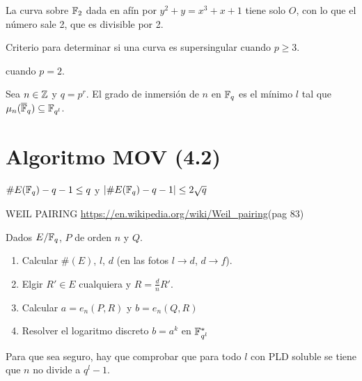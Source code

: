 \documentclass[CR.tex]{subfiles}
\begin{document}
\begin{ej}
La curva sobre $\mathbb{F}_2$ dada en afín por $y^2+y=x^3+x+1$ tiene solo $O$, con lo que el número sale 2, que es divisible por 2. 
\end{ej}

\begin{prop}[3.4.3]
Criterio para determinar si una curva es supersingular cuando $p\geq 3$. 
\end{prop}
\begin{prop}[3.4.4]
 cuando $p=2$. 
\end{prop}

\begin{defi}
Sea $n\in\mathbb{Z}$ y $q=p^r$. El grado de inmersión de $n$ en $\mathbb{F}_q$ es el mínimo $l$ tal que $\mu_n(\overline{\mathbb{F}}_q)\subseteq \mathbb{F}_{q^l}$. 
\end{defi}

\section{Algoritmo MOV (4.2)}

\begin{teorema}
$\#E(\mathbb{F}_q)-q-1\leq q$ y $|\#E(\mathbb{F}_q)-q-1|\leq 2\sqrt{q}$
\end{teorema}

\begin{prop}[4.2.2]

\end{prop}

WEIL PAIRING \url{https://en.wikipedia.org/wiki/Weil_pairing}(pag 83)

Dados $E/\mathbb{F}_q$, $P$ de orden $n$ y $Q$.
\begin{enumerate}
\item Calcular $\#(E)$, $l$, $d$ (en las fotos $l\rightarrow d$, $d\rightarrow f$).
\item Elgir $R'\in E$ cualquiera y $R=\frac{d}{n}R'$.
\item Calcular $a=e_n(P,R)$ y $b=e_n(Q,R)$
\item Resolver el logaritmo discreto $b=a^k$ en $\mathbb{F}_{q^l}^*$
\end{enumerate}
\begin{nota}
Para que sea seguro, hay que comprobar que para todo $l$ con PLD soluble se tiene que $n$ no divide a $q^l-1$.
\end{nota}
\end{document}
